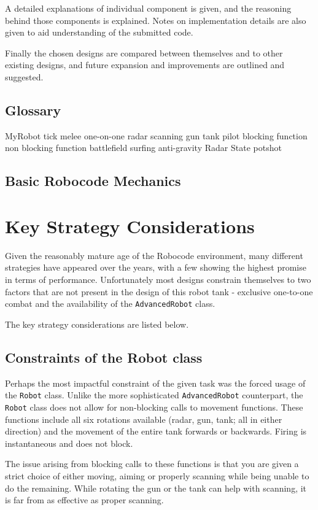 \documentclass[11pt]{report}
\begin{document}
A detailed explanations of individual component is given, and the reasoning behind those components is explained. Notes on implementation details are also given to aid understanding of the submitted code.

Finally the chosen designs are compared between themselves and to other existing designs, and future expansion and improvements are outlined and suggested.

\section{Glossary}
MyRobot
tick
melee
one-on-one
radar
scanning
gun
tank
pilot
blocking function
non blocking function
battlefield
surfing
anti-gravity
Radar
State
potshot

\section{Basic Robocode Mechanics}

\chapter{Key Strategy Considerations} %

Given the reasonably mature age of the Robocode environment, many different strategies have appeared over the years, with a few showing the highest promise in terms of performance. Unfortunately most designs constrain themselves to two factors that are not present in the design of this robot tank - exclusive one-to-one combat and the availability of the \texttt{AdvancedRobot} class.

The key strategy considerations are listed below.

\section{Constraints of the Robot class}
Perhaps the most impactful constraint of the given task was the forced usage of the \texttt{Robot} class. Unlike the more sophisticated \texttt{AdvancedRobot} counterpart, the \texttt{Robot} class does not allow for non-blocking calls to movement functions. These functions include all six rotations available (radar, gun, tank; all in either direction) and the movement of the entire tank forwards or backwards. Firing is instantaneous and does not block.

The issue arising from blocking calls to these functions is that you are given a strict choice of either moving, aiming or properly scanning while being unable to do the remaining. While rotating the gun or the tank can help with scanning, it is far from as effective as proper scanning.
\end{document}
